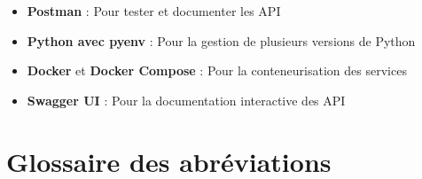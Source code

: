 \begin{itemize}
  \item \textbf{Postman} : Pour tester et documenter les API
  
  \item \textbf{Python avec pyenv} : Pour la gestion de plusieurs versions de Python
  
  \item \textbf{Docker} et \textbf{Docker Compose} : Pour la conteneurisation des services
  
  \item \textbf{Swagger UI} : Pour la documentation interactive des API
\end{itemize}

\section{Glossaire des abréviations}

